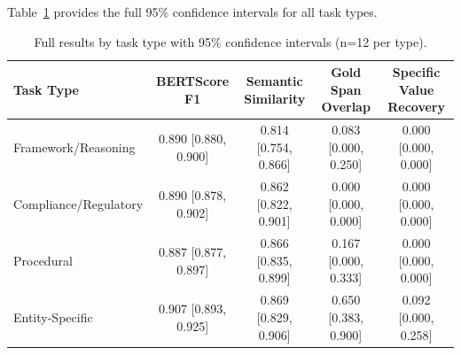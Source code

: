 \documentclass[sigconf,anonymous,review,balance=false]{acmart}
\begin{document}
Table~\ref{tab:ci} provides the full 95\% confidence intervals for all task types.

\begin{table}[h]
\caption{Full results by task type with 95\% confidence intervals (n=12 per type).}
\label{tab:ci}
\begin{tabular}{lcccc}
\toprule
\textbf{Task Type} & \textbf{BERTScore F1} & \textbf{Semantic Similarity} & \textbf{Gold Span Overlap} & \textbf{Specific Value Recovery} \\
\midrule
Framework/Reasoning & 0.890 [0.880, 0.900] & 0.814 [0.754, 0.866] & 0.083 [0.000, 0.250] & 0.000 [0.000, 0.000] \\
Compliance/Regulatory & 0.890 [0.878, 0.902] & 0.862 [0.822, 0.901] & 0.000 [0.000, 0.000] & 0.000 [0.000, 0.000] \\
Procedural & 0.887 [0.877, 0.897] & 0.866 [0.835, 0.899] & 0.167 [0.000, 0.333] & 0.000 [0.000, 0.000] \\
Entity-Specific & 0.907 [0.893, 0.925] & 0.869 [0.829, 0.906] & 0.650 [0.383, 0.900] & 0.092 [0.000, 0.258] \\
\bottomrule
\end{tabular}
\end{table}
\end{document}
